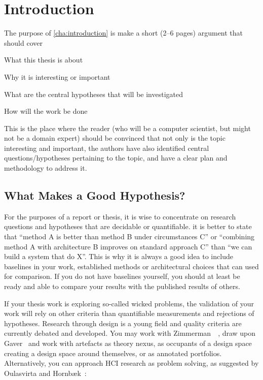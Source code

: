 \chapter{Introduction}
\label{cha:introduction}

The purpose of \autoref{cha:introduction} is make a short (2--6 pages)
argument that should cover
\begin{aenumerate}
\item What this thesis is about
\item Why it is interesting or important
\item What are the central hypotheses that will be investigated 
\item How will the work be done
\end{aenumerate}

This is the place where the reader (who will be a computer scientist, but
might not be a domain expert) should be convinced that not only is the topic
interesting and important, the authors have also identified central
questions/hypotheses pertaining to the topic, and have a clear plan and
methodology to address it.

\section{What Makes a Good Hypothesis?}
\label{sec:what-makes-good}

For the purposes of a report or thesis, it is wise to concentrate on
research questions and hypotheses that are decidable or quantifiable. \Eg it
is better to state that ``method A is better than method B under
circumstances C'' or ``combining method A with architecture B improves on
standard approach C'' than ``we can build a system that do X''.  This is why
it is always a good idea to include baselines in your work, \ie established
methods or architectural choices that can used for comparison. If you do not
have baselines yourself, you should at least be ready and able to compare
your results with the published results of others.

If your thesis work is exploring so-called wicked problems, the validation
of your work will rely on other criteria than quantifiable measurements and
rejections of hypotheses.  Research through design is a young field and
quality criteria are currently debated and developed. You may work with
Zimmerman~\etal~\cite{Zimmerman2007:POTSCOHFICS2007}, draw upon
Gaver~\cite{Gaver2012:POTSCOHFICS2012} and work with artefacts as theory
nexus, as occupants of a design space creating a design space around
themselves, or as annotated portfolios. Alternatively, you can approach HCI
research as problem solving, as suggested by Oulasvirta and
Hornbæk~\cite{Oulasvirta2016:POT2CCOHFICS2016}:

